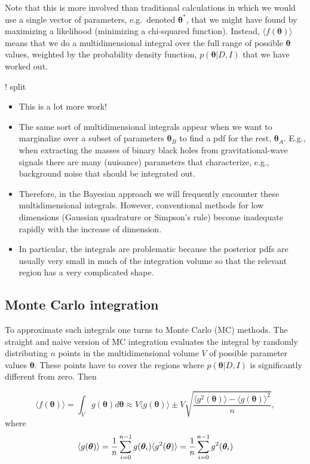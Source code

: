 \documentclass[%
oneside,                 %
final,                   %
10pt]{article}
\begin{document}
Note that this is more involved than traditional calculations in which we would use a single vector of parameters, e.g.~denoted $\boldsymbol{\theta}^*$, that we might have found by maximizing a likelihood (minimizing a chi-squared function). Instead, $\langle f( \boldsymbol{\theta} ) \rangle$ means that we do a multidimensional integral over the full range of possible $\boldsymbol{\theta}$ values, weighted by the probability density function, $p(\boldsymbol{\theta} |D,I)$ that we have worked out.

! split
\begin{itemize}
\item This is a lot more work!

\item The same sort of multidimensional integrals appear when we want to marginalize over a subset of parameters $\boldsymbol{\theta}_B$ to find a pdf for the rest, $\boldsymbol{\theta}_A$. E.g., when extracting the masses of binary black holes from gravitational-wave signals there are many (nuisance) parameters that characterize, e.g.,   background noise that should be integrated out.

\item Therefore, in the Bayesian approach we will frequently encounter these multidimensional integrals. However, conventional methods for low dimensions (Gaussian quadrature or Simpson's rule) become inadequate rapidly with the increase of dimension.

\item In particular, the integrals are problematic because the posterior pdfs are usually very small in much of the integration volume so that the relevant region has a very complicated shape.
\end{itemize}

\noindent
\subsection{Monte Carlo integration}
To approximate such integrals one turns to Monte Carlo (MC) methods. The straight and naive version of MC integration evaluates the integral by randomly distributing $n$ points in the multidimensional volume $V$ of possible parameter values $\boldsymbol{\theta}$. These points have to cover the regions where $p( \boldsymbol{\theta} |D,I)$ is significantly different from zero. Then

\[
\langle f( \boldsymbol{\theta} ) \rangle = \int_V g( \boldsymbol{\theta} ) d\boldsymbol{\theta} \approx V \langle g( \boldsymbol{\theta} ) \rangle 
\pm V \sqrt{ \frac{\langle g^2( \boldsymbol{\theta} ) \rangle - \langle g( \boldsymbol{\theta} ) \rangle^2 }{n} },
\]
where
\[
\langle g( \boldsymbol{\theta} ) \rangle = \frac{1}{n} \sum_{i=0}^{n-1} g(\boldsymbol{\theta}_i ) \\
\langle g^2( \boldsymbol{\theta} ) \rangle = \frac{1}{n} \sum_{i=0}^{n-1} g^2(\boldsymbol{\theta}_i )
\]
\end{document}
